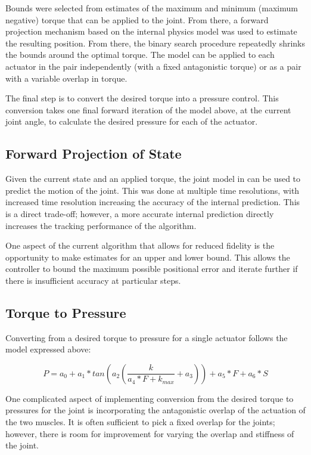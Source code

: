 Bounds were selected from estimates
of the maximum and minimum (maximum negative) torque that can be applied to the
joint. From there, a forward projection mechanism based on the internal physics model was
used to estimate the resulting position. From there, the binary search procedure
repeatedly shrinks the bounds around the optimal torque. The model can be 
applied to each actuator in the pair independently (with a fixed antagonistic 
torque) or as a pair with a variable overlap in torque. 

The final
step is to convert the desired torque into a pressure control. This conversion takes
one final forward iteration of the model above, at the current joint angle, to 
calculate the desired pressure for each of the actuator.

\subsection{Forward Projection of State}

Given the current state and an applied torque, the joint model in 
 can be used to predict the motion of the joint.
This was done at multiple time resolutions, with increased time resolution 
increasing the accuracy of the internal prediction. This is a direct trade-off;
however, a more accurate internal prediction directly increases the tracking
performance of the algorithm.

One aspect of the current algorithm that allows for reduced fidelity is the 
opportunity to make estimates for an upper and lower bound. This allows the 
controller to bound the maximum possible positional error and iterate further
if there is insufficient accuracy at particular steps.

\subsection{Torque to Pressure}

Converting from a desired torque to pressure for a single actuator follows
the model expressed above:

\begin{equation}
P = a_{0} + a_{1} * tan(a_{2} (\dfrac{k}{a_{4} * F + k_{max}} + a_{3})) + a_{5} * F + a_{6} * S
\end{equation}

One complicated aspect of implementing conversion from the desired torque to 
pressures for
the joint is incorporating the antagonistic overlap of the actuation of the two 
muscles. It is often sufficient to pick a fixed overlap for the joints; however,
there is room for improvement for varying the overlap and stiffness of the joint.

